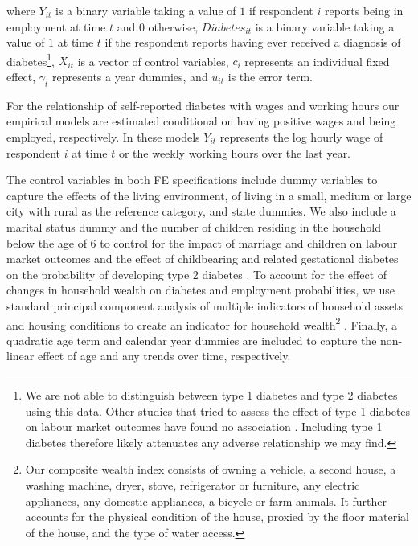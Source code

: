 where $Y_{it}$ is a binary variable taking a value of $1$ if respondent $i$ reports being in employment at time $t$ and $0$ otherwise, $Diabetes_{it}$ is a binary variable taking a value of $1$ at time $t$ if the respondent reports having ever received a diagnosis of diabetes\footnote{We are not able to distinguish between type 1 diabetes and type 2 diabetes using this data. Other studies that tried to assess the effect of type 1 diabetes on labour market outcomes have found no association \parencite{Minor2011,Minor2015}. Including type 1 diabetes therefore likely attenuates any adverse relationship we may find.}, $X_{it}$ is a vector of control variables, $c_{i}$ represents an individual fixed effect, $\gamma_{t}$ represents a year dummies, and $u_{it}$ is the error term.

For the relationship of self-reported diabetes with wages and working hours our empirical models are estimated conditional on having positive wages and being employed, respectively. In these models $Y_{it}$ represents the log hourly wage of respondent $i$ at time $t$ or the weekly working hours over the last year.

The control variables in both \ac{FE} specifications include dummy variables to capture the effects of the living environment,
of living in a small, medium or large city with rural as the reference category, and state dummies. We also include a marital status dummy and the number of children residing in the household below the age of 6 to control for the impact of marriage and children
on labour market outcomes and the effect of childbearing and related gestational diabetes on the probability of developing type 2 diabetes
\parencite{Bellamy2009}. To account for the effect of changes in household wealth on diabetes and employment probabilities, we use standard
principal component analysis of multiple indicators of household assets and housing conditions to create an indicator for household wealth\footnote{Our composite wealth index consists of owning a vehicle, a second house, a washing machine, dryer, stove, refrigerator or furniture, any electric appliances, any domestic appliances, a bicycle or farm animals. It further accounts for the physical condition of the house, proxied by the floor material of the house, and the type of water access.}
\parencite{Filmer2001}. Finally, a quadratic age term and calendar year dummies are included to capture the non-linear effect of age and any trends over time, respectively.

